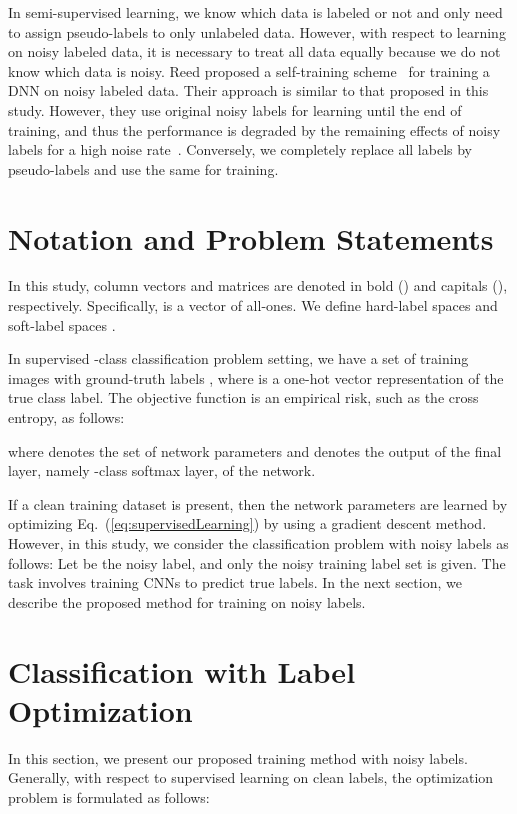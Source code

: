 \documentclass[10pt,twocolumn,letterpaper]{article}
\newcommand{\Eref}[1]{Eq.~(\ref{#1})}
\begin{document}
In semi-supervised learning, we know which data is labeled or not and only need to assign pseudo-labels to only unlabeled data. However, with respect to learning on noisy labeled data, it is necessary to treat all data equally because we do not know which data is noisy. Reed \etal proposed a self-training scheme~\cite{reed2014training} for training a DNN on noisy labeled data. Their approach is similar to that proposed in this study. However, they use original noisy labels for learning until the end of training, and thus the performance is degraded by the remaining effects of noisy labels for a high noise rate~\cite{reed2014training,jindal2016learning}. Conversely, we completely replace all labels by pseudo-labels and use the same for training.

\section{Notation and Problem Statements}
In this study, column vectors and matrices are denoted in bold (\eg ) and capitals (\eg ), respectively. Specifically,  is a vector of all-ones.
We define hard-label spaces  and soft-label spaces .

In supervised -class classification problem setting, we have a set of  training images 
with ground-truth labels ,
where  is a one-hot vector representation of the true class label. The objective function is an empirical risk, such as the cross entropy, as follows:

where  denotes the set of network parameters and  denotes the output of the final layer, namely -class softmax layer, of the network.

If a clean training dataset is present, then the network parameters  are learned by optimizing \Eref{eq:supervisedLearning} by using a gradient descent method. However, in this study, we consider the classification problem with noisy labels as follows: Let  be the noisy label, and only the noisy training label set  is given. The task involves training CNNs to predict true labels. In the next section, we describe the proposed method for training on noisy labels.

\section{Classification with Label Optimization}
In this section, we present our proposed training method with noisy labels.
Generally, with respect to supervised learning on clean labels, the optimization problem is formulated as follows:
\end{document}
